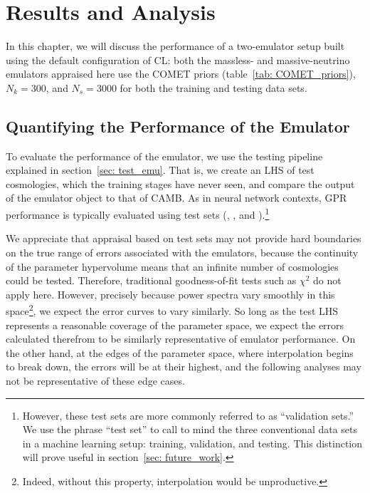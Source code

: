 \chapter{Results and Analysis}
\label{chap: results}

In this chapter, we will discuss the performance of a two-emulator setup
built using the default configuration of CL: both the massless- and
massive-neutrino emulators appraised here use the COMET priors
(table~\ref{tab: COMET_priors}), $N_k = 300$, and $N_s = 3000$ for both the
training and testing data sets.

\section{Quantifying the Performance of the Emulator}

To evaluate the performance of the emulator, we use the testing pipeline
explained in section~\ref{sec: test_emu}.
That is, we create an LHS of test cosmologies, which the training stages have
never seen, and compare the output of the emulator object to that of
CAMB. As in neural network contexts, GPR performance is typically evaluated
using test sets (\citealp{Mancini}, \citealp{Arico}, and
\citealp{Eggemeier}).\footnote{However, these test sets are
more commonly referred to as ``validation sets.'' We use the phrase
``test set'' to call to mind the three conventional data sets in a machine
learning setup: training, validation, and testing. This distinction will
prove useful in section~\ref{sec: future_work}.}

We appreciate that appraisal based on test sets
may not provide hard boundaries on the true
range of errors associated with the emulators,
because the continuity of the parameter hypervolume means that an infinite
number of cosmologies could be tested. Therefore, traditional
goodness-of-fit tests such as $\chi^2$ do not apply here.
However, precisely because
power spectra vary smoothly in this space\footnote{Indeed, without this
property, interpolation would be unproductive.}, we expect the error 
curves to vary similarly. So long as the test LHS represents a reasonable
coverage of the parameter space, we expect the errors calculated therefrom to
be similarly representative of emulator performance. On the other
hand, at the edges of the parameter space, where interpolation begins to
break down, the errors will be at their highest, and the following analyses
may not be representative of these edge cases.

